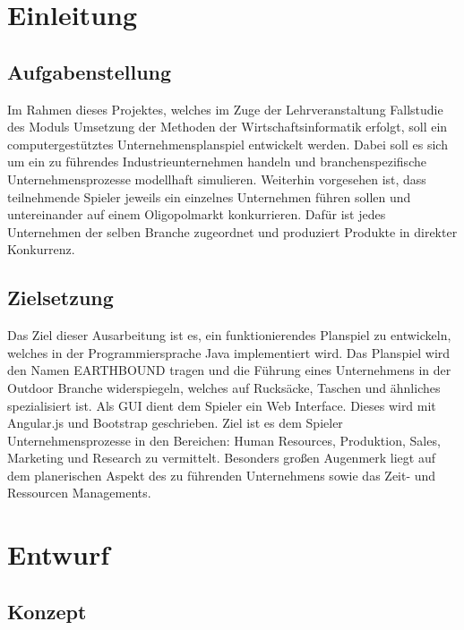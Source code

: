 \chapter{Einleitung}
\section{Aufgabenstellung}
Im Rahmen dieses Projektes, welches im Zuge der Lehrveranstaltung Fallstudie des Moduls Umsetzung der Methoden der Wirtschaftsinformatik erfolgt, soll ein computergestütztes Unternehmensplanspiel entwickelt werden. Dabei soll es sich um ein zu führendes Industrieunternehmen handeln und branchenspezifische Unternehmensprozesse modellhaft simulieren. Weiterhin vorgesehen ist, dass teilnehmende Spieler jeweils ein einzelnes Unternehmen führen sollen und untereinander auf einem Oligopolmarkt konkurrieren. Dafür ist jedes Unternehmen der selben Branche zugeordnet und produziert Produkte in direkter Konkurrenz.
\section{Zielsetzung}
Das Ziel dieser Ausarbeitung ist es, ein funktionierendes Planspiel zu entwickeln, welches in der Programmiersprache Java implementiert wird. Das Planspiel wird den Namen EARTHBOUND tragen und die Führung eines Unternehmens in der Outdoor Branche widerspiegeln, welches auf Rucksäcke, Taschen und ähnliches spezialisiert ist. Als GUI dient dem Spieler ein Web Interface. Dieses wird mit Angular.js und Bootstrap geschrieben. Ziel ist es dem Spieler Unternehmensprozesse in den Bereichen: Human Resources, Produktion, Sales, Marketing und Research zu vermittelt. Besonders großen Augenmerk liegt auf dem planerischen Aspekt des zu führenden Unternehmens sowie das Zeit- und Ressourcen Managements.
\chapter{Entwurf}
\section{Konzept}
